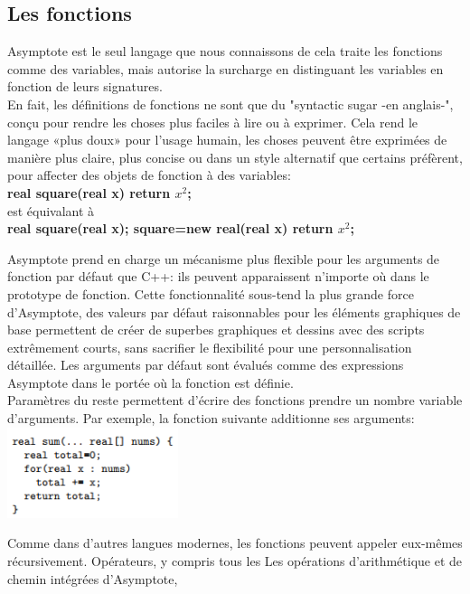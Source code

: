 \documentclass[a4paper]{report}
\begin{document}
\subsection{Les fonctions}
Asymptote est le seul langage que nous connaissons de cela
traite les fonctions comme des variables, mais autorise la surcharge
en distinguant les variables en fonction de leurs signatures.\\
En fait, les définitions de fonctions ne sont que du "syntactic sugar -en anglais-", conçu pour rendre les choses plus faciles à lire ou à exprimer. Cela rend le langage «plus doux» pour l'usage humain, les choses peuvent être exprimées de manière plus claire, plus concise ou dans un style alternatif que certains préfèrent, pour affecter des objets de fonction à des variables:\smallskip\\
\textbf{real square(real x) return $x^2$;}\\
est équivalant à\\
\textbf{real square(real x);  square=new real(real x) return $x^2$;}\smallskip\\
 \par Asymptote prend en charge un mécanisme plus flexible pour les arguments de fonction par défaut que C++: ils peuvent apparaissent n'importe où dans le prototype de fonction. Cette fonctionnalité sous-tend la plus grande force d'Asymptote, des valeurs par défaut raisonnables pour les éléments graphiques de base permettent de créer de superbes graphiques et dessins avec des scripts extrêmement courts, sans sacrifier le flexibilité pour une personnalisation détaillée. Les arguments par défaut sont évalués comme des expressions Asymptote dans le portée où la fonction est définie.\\
Paramètres du reste permettent d'écrire des fonctions prendre un nombre variable d'arguments. Par exemple, la fonction suivante additionne ses arguments:\\
\includegraphics[width=5cm]{images/cap2.png}\\
\par Comme dans d'autres langues modernes, les fonctions peuvent appeler
eux-mêmes récursivement. Opérateurs, y compris tous les
Les opérations d'arithmétique et de chemin intégrées d'Asymptote,
\end{document}
